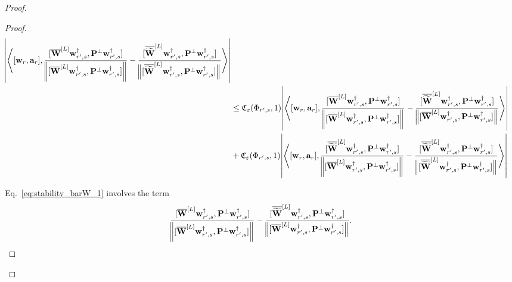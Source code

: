 \begin{claim}
\begin{proof}
\begin{proof}
\begin{align}
						\abs{\left\langle [\mathbf{w}_r, \mathbf{a}_r], \frac{[\overline{\mathbf{W}}^{[L]} \mathbf{w}_{r', s}^{\dagger}, \mathbf{P}^{\perp}\mathbf{w}_{r', s}^{\dagger}]}{\norm{[\overline{\mathbf{W}}^{[L]} \mathbf{w}_{r', s}^{\dagger}, \mathbf{P}^{\perp}\mathbf{w}_{r', s}^{\dagger}]}} - \frac{[\overline{\widetilde{\mathbf{W}}}^{[L]} \mathbf{w}_{r', s}^{\dagger}, \mathbf{P}^{\perp}\mathbf{w}_{r', s}^{\dagger}]}{\norm[2]{[\overline{\widetilde{\mathbf{W}}}^{[L]} \mathbf{w}_{r', s}^{\dagger}, \mathbf{P}^{\perp}\mathbf{w}_{r', s}^{\dagger}]}}\right\rangle} \nonumber\\&
						\le \mathfrak{C}_{\varepsilon}(\Phi_{r', s}, 1) 
						\abs{\left\langle [\mathbf{w}_r, \mathbf{a}_r], \frac{[\overline{\mathbf{W}}^{[L]} \mathbf{w}_{r', s}^{\dagger}, \mathbf{P}^{\perp}\mathbf{w}_{r', s}^{\dagger}]}{\norm{[\overline{\mathbf{W}}^{[L]} \mathbf{w}_{r', s}^{\dagger}, \mathbf{P}^{\perp}\mathbf{w}_{r', s}^{\dagger}]}} - \frac{[\overline{\widetilde{\mathbf{W}}}^{[L]} \mathbf{w}_{r', s}^{\dagger}, \mathbf{P}^{\perp}\mathbf{w}_{r', s}^{\dagger}]}{\norm[2]{[\overline{\mathbf{W}}^{[L]} \mathbf{w}_{r', s}^{\dagger}, \mathbf{P}^{\perp}\mathbf{w}_{r', s}^{\dagger}]}}\right\rangle}  \label{eq:stability_barW_1}\\&
						+ \mathfrak{C}_{\varepsilon}(\Phi_{r', s}, 1) 
						\abs{\left\langle [\mathbf{w}_r, \mathbf{a}_r], \frac{[\overline{\widetilde{\mathbf{W}}}^{[L]} \mathbf{w}_{r', s}^{\dagger}, \mathbf{P}^{\perp}\mathbf{w}_{r', s}^{\dagger}]}{\norm{[\overline{\mathbf{W}}^{[L]} \mathbf{w}_{r', s}^{\dagger}, \mathbf{P}^{\perp}\mathbf{w}_{r', s}^{\dagger}]}} - \frac{[\overline{\widetilde{\mathbf{W}}}^{[L]} \mathbf{w}_{r', s}^{\dagger}, \mathbf{P}^{\perp}\mathbf{w}_{r', s}^{\dagger}]}{\norm[2]{[\overline{\widetilde{\mathbf{W}}}^{[L]} \mathbf{w}_{r', s}^{\dagger}, \mathbf{P}^{\perp}\mathbf{w}_{r', s}^{\dagger}]}}\right\rangle}  \label{eq:stability_barW_2}
					\end{align}
					
					Eq.~\ref{eq:stability_barW_1} involves the term
					\begin{align*}
						\frac{[\overline{\mathbf{W}}^{[L]} \mathbf{w}_{r', s}^{\dagger}, \mathbf{P}^{\perp}\mathbf{w}_{r', s}^{\dagger}]}{\norm{[\overline{\mathbf{W}}^{[L]} \mathbf{w}_{r', s}^{\dagger}, \mathbf{P}^{\perp}\mathbf{w}_{r', s}^{\dagger}]}} - \frac{[\overline{\widetilde{\mathbf{W}}}^{[L]} \mathbf{w}_{r', s}^{\dagger}, \mathbf{P}^{\perp}\mathbf{w}_{r', s}^{\dagger}]}{\norm[2]{[\overline{\mathbf{W}}^{[L]} \mathbf{w}_{r', s}^{\dagger}, \mathbf{P}^{\perp}\mathbf{w}_{r', s}^{\dagger}]}}.
					\end{align*}
					

\end{proof}
\end{proof}
\end{claim}
